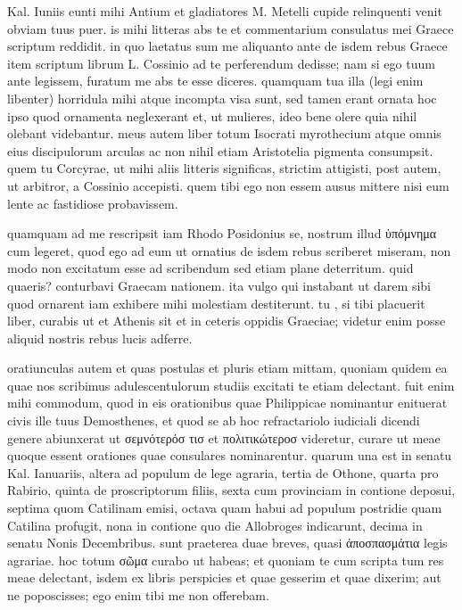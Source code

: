 


 Kal. Iuniis eunti mihi Antium et gladiatores M. Metelli cupide relinquenti venit obviam tuus puer. is mihi litteras abs te et commentarium consulatus mei Graece scriptum reddidit. in quo laetatus sum me aliquanto ante de isdem rebus Graece item scriptum librum L. Cossinio ad te perferendum dedisse; nam si ego tuum ante legissem, furatum me abs te esse diceres. quamquam tua illa (legi enim libenter) horridula mihi atque incompta visa sunt, sed tamen erant ornata hoc ipso quod ornamenta neglexerant et, ut mulieres, ideo bene olere quia nihil olebant videbantur. meus autem liber totum Isocrati myrothecium atque omnis eius discipulorum arculas ac non nihil etiam Aristotelia pigmenta consumpsit. quem tu Corcyrae, ut mihi aliis litteris significas, strictim attigisti, post autem, ut arbitror, a Cossinio accepisti. quem tibi ego non essem ausus mittere nisi eum lente ac fastidiose probavissem.

 quamquam ad me rescripsit iam Rhodo Posidonius se, nostrum illud ὑπόμνημα cum legeret, quod ego ad eum ut ornatius de isdem rebus scriberet miseram, non modo non excitatum esse ad scribendum sed etiam plane deterritum. quid quaeris? conturbavi Graecam nationem. ita vulgo qui instabant ut darem sibi quod ornarent iam exhibere mihi molestiam destiterunt. tu , si tibi placuerit liber, curabis ut et Athenis sit et in ceteris oppidis Graeciae; videtur enim posse aliquid nostris rebus lucis adferre.

 oratiunculas autem et quas postulas et pluris etiam mittam, quoniam quidem ea quae nos scribimus adulescentulorum studiis excitati te etiam delectant. fuit enim mihi commodum, quod in eis orationibus quae Philippicae nominantur enituerat civis ille tuus Demosthenes, et quod se ab hoc refractariolo iudiciali dicendi genere abiunxerat ut σεμνότερόσ τισ et πολιτικώτεροσ videretur, curare ut meae quoque essent orationes quae consulares nominarentur. quarum una est in senatu Kal. Ianuariis, altera ad populum de lege agraria, tertia de Othone, quarta pro Rabirio, quinta de proscriptorum filiis, sexta cum provinciam in contione deposui, septima quom Catilinam emisi, octava quam habui ad populum postridie quam Catilina profugit, nona in contione quo die Allobroges indicarunt, decima in senatu Nonis Decembribus. sunt praeterea duae breves, quasi ἀποσπασμάτια legis agrariae. hoc totum σῶμα curabo ut habeas; et quoniam te cum scripta tum res meae delectant, isdem ex libris perspicies et quae gesserim et quae dixerim; aut ne poposcisses; ego enim tibi me non offerebam.

